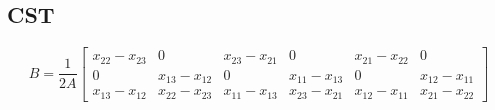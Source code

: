\hypertarget{cst}{%
\subsection{CST}\label{cst}}

\[B=\dfrac{1}{2A}\left[\begin{array}{cccccc}
x_{22}-x_{23} & 0 & x_{23}-x_{21} & 0 & x_{21}-x_{22} & 0 \\
0 & x_{13}-x_{12} & 0 & x_{11}-x_{13} & 0 & x_{12}-x_{11} \\
x_{13}-x_{12} & x_{22}-x_{23} & x_{11}-x_{13} & x_{23}-x_{21} & x_{12}-x_{11} & x_{21}-x_{22}
\end{array}\right]\]
